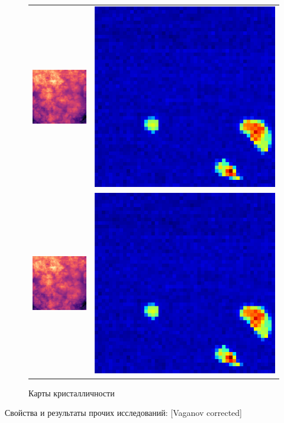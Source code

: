 	\begin{figure}[ht]\center
\begin{tabular}{cc}
\includegraphics[width=0.5\linewidth]{fig/map-1.png}
&
\includegraphics[width=0.5\linewidth]{fig/map-2.png} \\
\includegraphics[width=0.5\linewidth]{fig/map-1.png}
&
\includegraphics[width=0.5\linewidth]{fig/map-2.png}
\end{tabular}
\caption{Карты кристалличности}
\end{figure}
	
	

	
	
	
	Свойства и результаты прочих исследований:
	[Vaganov corrected]